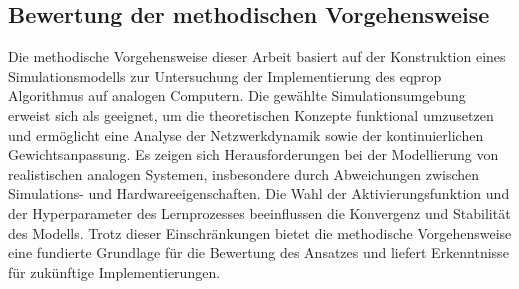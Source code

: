 \subsection{Bewertung der methodischen Vorgehensweise}

Die methodische Vorgehensweise dieser Arbeit basiert auf der Konstruktion eines Simulationsmodells zur Untersuchung der Implementierung des \gls{eqprop} Algorithmus auf analogen Computern. Die gewählte Simulationsumgebung erweist sich als geeignet, um die theoretischen Konzepte funktional umzusetzen und ermöglicht eine Analyse der Netzwerkdynamik sowie der kontinuierlichen Gewichtsanpassung. Es zeigen sich Herausforderungen bei der Modellierung von realistischen analogen Systemen, insbesondere durch Abweichungen zwischen Simulations- und Hardwareeigenschaften. Die Wahl der Aktivierungsfunktion und der Hyperparameter des Lernprozesses beeinflussen die Konvergenz und Stabilität des Modells. Trotz dieser Einschränkungen bietet die methodische Vorgehensweise eine fundierte Grundlage für die Bewertung des Ansatzes und liefert Erkenntnisse für zukünftige Implementierungen.
